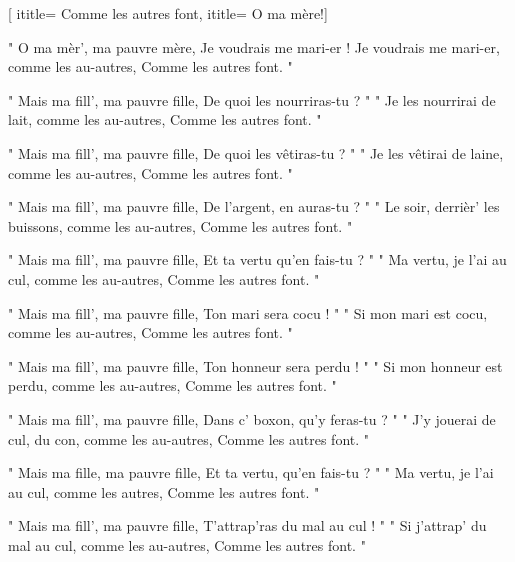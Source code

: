  [
ititle= {Comme les autres font},
ititle= {O ma mère!}]


\beginverse
" O ma mèr', ma pauvre mère,
Je voudrais me mari-er !
Je voudrais me mari-er, comme les au-autres,
 {Comme les autres font. "}
\endverse

\beginverse
" Mais ma fill', ma pauvre fille,
De quoi les nourriras-tu ? "
" Je les nourrirai de lait, comme les au-autres,
 {Comme les autres font. "}
\endverse

\beginverse
" Mais ma fill', ma pauvre fille,
De quoi les vêtiras-tu ? "
" Je les vêtirai de laine, comme les au-autres,
 {Comme les autres font. "}
\endverse

\beginverse
" Mais ma fill', ma pauvre fille,
De l'argent, en auras-tu ? "
" Le soir, derrièr' les buissons, comme les au-autres,
 {Comme les autres font. "}
\endverse

\beginverse
" Mais ma fill', ma pauvre fille,
Et ta vertu qu'en fais-tu ? "
" Ma vertu, je l'ai au cul, comme les au-autres,
 {Comme les autres font. "}
\endverse

\beginverse
" Mais ma fill', ma pauvre fille,
Ton mari sera cocu ! "
" Si mon mari est cocu, comme les au-autres,
 {Comme les autres font. "}
\endverse

\beginverse
" Mais ma fill', ma pauvre fille,
Ton honneur sera perdu ! "
" Si mon honneur est perdu, comme les au-autres,
 {Comme les autres font. "}
\endverse

\beginverse
" Mais ma fill', ma pauvre fille,
Dans c' boxon, qu'y feras-tu ? "
" J'y jouerai de cul, du con, comme les au-autres,
 {Comme les autres font. "}
\endverse

\beginverse
" Mais ma fille, ma pauvre fille,
Et ta vertu, qu'en fais-tu ? "
" Ma vertu, je l'ai au cul, comme les autres,
 {Comme les autres font. "}
\endverse

\beginverse
" Mais ma fill', ma pauvre fille,
T'attrap'ras du mal au cul ! "
" Si j'attrap' du mal au cul, comme les au-autres,
 {Comme les autres font. "}
\endverse

\endsong

